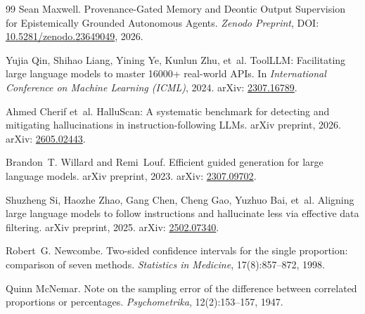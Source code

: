 \documentclass[11pt,a4paper]{article}
\begin{document}

\begin{thebibliography}{99}
Sean Maxwell.
\newblock Provenance-Gated Memory and Deontic Output Supervision for Epistemically Grounded Autonomous Agents.
\newblock \emph{Zenodo Preprint}, DOI: \href{https://doi.org/10.5281/zenodo.23649049}{10.5281/zenodo.23649049}, 2026.

Yujia Qin, Shihao Liang, Yining Ye, Kunlun Zhu, et~al.
\newblock ToolLLM: Facilitating large language models to master 16000+ real-world APIs.
\newblock In \emph{International Conference on Machine Learning (ICML)}, 2024. arXiv: \href{https://arxiv.org/abs/2307.16789}{2307.16789}.

Ahmed Cherif et~al.
\newblock HalluScan: A systematic benchmark for detecting and mitigating hallucinations in instruction-following LLMs.
\newblock arXiv preprint, 2026. arXiv: \href{https://arxiv.org/abs/2605.02443}{2605.02443}.

Brandon~T. Willard and Remi~Louf.
\newblock Efficient guided generation for large language models.
\newblock arXiv preprint, 2023. arXiv: \href{https://arxiv.org/abs/2307.09702}{2307.09702}.

Shuzheng Si, Haozhe Zhao, Gang Chen, Cheng Gao, Yuzhuo Bai, et~al.
\newblock Aligning large language models to follow instructions and hallucinate less via effective data filtering.
\newblock arXiv preprint, 2025. arXiv: \href{https://arxiv.org/abs/2502.07340}{2502.07340}.

Robert~G. Newcombe.
\newblock Two-sided confidence intervals for the single proportion: comparison of seven methods.
\newblock \emph{Statistics in Medicine}, 17(8):857--872, 1998.

Quinn McNemar.
\newblock Note on the sampling error of the difference between correlated proportions or percentages.
\newblock \emph{Psychometrika}, 12(2):153--157, 1947.
\end{thebibliography}
\end{document}
